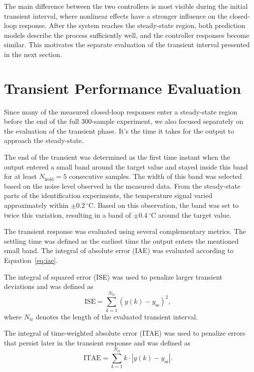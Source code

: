 The main difference between the two controllers is most visible during the initial transient interval, where nonlinear effects have a stronger influence on the closed-loop response. After the system reaches the steady-state region, both prediction models describe the process sufficiently well, and the controller responses become similar. This motivates the separate evaluation of the transient interval presented in the next section.



\section{Transient Performance Evaluation}
\label{sec:transient_evaluation}

Since many of the measured closed-loop responses enter a steady-state
region before the end of the full $300$-sample experiment, we also focused separately on the evaluation
of the transient phase. It's the time it takes for the output to approach the steady-state. 

The end of the transient was determined as the first time instant when
the output entered a small band around the target value and stayed inside
this band for at least $N_{\mathrm{hold}} = 5$ consecutive samples. 
The width of this band was selected based on the noise level observed in
the measured data. From the steady-state parts of the identification
experiments, the temperature signal varied approximately within
$\pm 0.2\,^\circ\mathrm{C}$. 
Based on this observation, the band was set to twice this variation,
resulting in a band of $\pm 0.4\,^\circ\mathrm{C}$ around the target value.


The transient response was evaluated using several complementary metrics. The settling time was defined as the earliest time the output enters the mentioned small band. The integral of absolute error (IAE) was evaluated according to Equation~\eqref{eq:iae}.

The integral of squared error (ISE) was used to penalize larger transient deviations and was defined as
\begin{equation}
\mathrm{ISE} = \sum_{k=1}^{N_{\mathrm{tr}}} \left( y(k) - y_{\mathrm{ss}} \right)^2,
\label{eq:ise}
\end{equation}
where $N_{\mathrm{tr}}$ denotes the length of the evaluated transient interval.

The integral of time-weighted absolute error (ITAE) was used to penalize errors that persist later in the transient response and was defined as
\begin{equation}
\mathrm{ITAE} = \sum_{k=1}^{N_{\mathrm{tr}}} k \cdot \left| y(k) - y_{\mathrm{ss}} \right|.
\label{eq:itae}
\end{equation}

